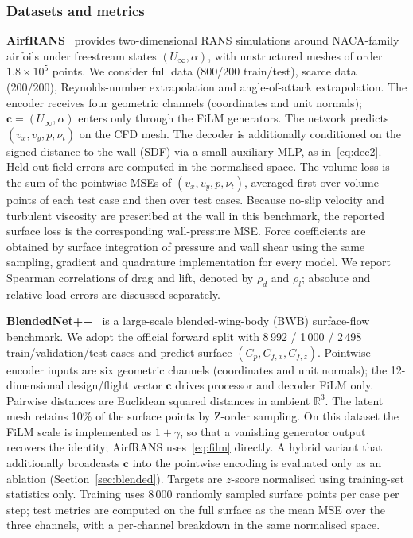 \documentclass[final,3p,times]{elsarticle}
\begin{document}
\subsubsection{Datasets and metrics}
\textbf{AirfRANS}~\cite{bonnet2022airfrans} provides two-dimensional RANS simulations around NACA-family airfoils under freestream states $(U_{\infty},\alpha)$, with unstructured meshes of order $1.8\times 10^{5}$ points. We consider full data (800/200 train/test), scarce data (200/200), Reynolds-number extrapolation and angle-of-attack extrapolation. The encoder receives four geometric channels (coordinates and unit normals); $\mathbf{c}=(U_{\infty},\alpha)$ enters only through the FiLM generators. The network predicts $(v_{x},v_{y},p,\nu_{t})$ on the CFD mesh. The decoder is additionally conditioned on the signed distance to the wall (SDF) via a small auxiliary MLP, as in~\eqref{eq:dec2}. Held-out field errors are computed in the normalised space. The volume loss is the sum of the pointwise MSEs of $(v_x,v_y,p,\nu_t)$, averaged first over volume points of each test case and then over test cases. Because no-slip velocity and turbulent viscosity are prescribed at the wall in this benchmark, the reported surface loss is the corresponding wall-pressure MSE. Force coefficients are obtained by surface integration of pressure and wall shear using the same sampling, gradient and quadrature implementation for every model. We report Spearman correlations of drag and lift, denoted by $\rho_d$ and $\rho_l$; absolute and relative load errors are discussed separately.

\textbf{BlendedNet++}~\cite{sung2025blendednetpp} is a large-scale blended-wing-body (BWB) surface-flow benchmark. We adopt the official forward split with 8\,992 / 1\,000 / 2\,498 train/validation/test cases and predict surface $(C_{p},C_{f,x},C_{f,z})$. Pointwise encoder inputs are six geometric channels (coordinates and unit normals); the 12-dimensional design/flight vector $\mathbf{c}$ drives processor and decoder FiLM only. Pairwise distances are Euclidean squared distances in ambient $\mathbb{R}^{3}$. The latent mesh retains 10\% of the surface points by Z-order sampling. On this dataset the FiLM scale is implemented as $1+\gamma$, so that a vanishing generator output recovers the identity; AirfRANS uses~\eqref{eq:film} directly. A hybrid variant that additionally broadcasts $\mathbf{c}$ into the pointwise encoding is evaluated only as an ablation (Section~\ref{sec:blended}). Targets are $z$-score normalised using training-set statistics only. Training uses 8\,000 randomly sampled surface points per case per step; test metrics are computed on the full surface as the mean MSE over the three channels, with a per-channel breakdown in the same normalised space.
\end{document}
